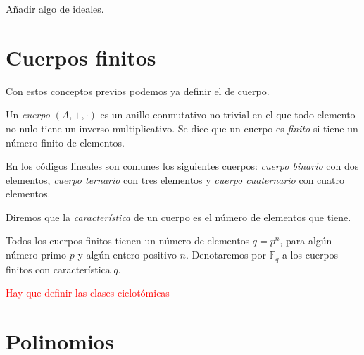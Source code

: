 Añadir algo de ideales.


    


\section{Cuerpos finitos}

Con estos conceptos previos podemos ya definir el de cuerpo.

\begin{definition}
    Un \emph{cuerpo} $(A, +, \cdot )$ es un anillo conmutativo no trivial en el que todo elemento no nulo tiene un inverso multiplicativo.
    Se dice que un cuerpo es \emph{finito} si tiene un número finito de elementos.
\end{definition}

En los códigos lineales son comunes los siguientes cuerpos: \emph{cuerpo binario} con dos elementos, 
\emph{cuerpo ternario} con tres elementos y \emph{cuerpo cuaternario} con cuatro elementos.

Diremos que la \emph{característica} de un cuerpo es el número de elementos que tiene.

Todos los cuerpos finitos tienen un número de elementos $q = p^n$, para algún número primo $p$ y algún entero positivo $n$.
Denotaremos por $\mathbb{F}_q$ a los cuerpos finitos con característica $q$.

\textcolor{red}{Hay que definir las clases ciclotómicas}


\section{Polinomios}

